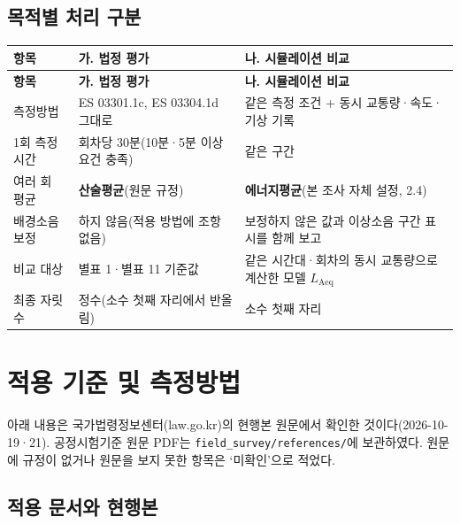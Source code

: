 \documentclass[10.5pt,a4paper]{article}
\newcommand{\Laeq}{\ensuremath{L_{\mathrm{Aeq}}}}
\newcommand{\hd}[1]{\cellcolor{headfill}\textbf{\sffamily #1}}
\begin{document}
\subsection{목적별 처리 구분}
\small
\begin{longtable}{>{\raggedright\arraybackslash}p{}>{\raggedright\arraybackslash}p{}>{\raggedright\arraybackslash}p{}}
\toprule
\hd{항목} & \hd{가. 법정 평가} & \hd{나. 시뮬레이션 비교} \\ \midrule
\endfirsthead
\toprule
\hd{항목} & \hd{가. 법정 평가} & \hd{나. 시뮬레이션 비교} \\ \midrule
\endhead
\bottomrule
\endlastfoot
측정방법 & ES 03301.1c, ES 03304.1d 그대로 & 같은 측정 조건 + 동시 교통량·속도·기상 기록 \\ \midrule
1회 측정시간 & 회차당 30분(10분·5분 이상 요건 충족) & 같은 구간 \\ \midrule
여러 회 평균 & \textbf{산술평균}(원문 규정) & \textbf{에너지평균}(본 조사 자체 설정, 2.4) \\ \midrule
배경소음 보정 & 하지 않음(적용 방법에 조항 없음) & 보정하지 않은 값과 이상소음 구간 표시를 함께 보고 \\ \midrule
비교 대상 & 별표 1·별표 11 기준값 & 같은 시간대·회차의 동시 교통량으로 계산한 모델 \Laeq \\ \midrule
최종 자릿수 & 정수(소수 첫째 자리에서 반올림) & 소수 첫째 자리 \\
\end{longtable}
\addtocounter{table}{-1}
\normalsize
{}\section{적용 기준 및 측정방법}
아래 내용은 국가법령정보센터(law.go.kr)의 현행본 원문에서 확인한 것이다(2026-10-19·21). 공정시험기준 원문 PDF는 \texttt{field\_survey/references/}에 보관하였다. 원문에 규정이 없거나 원문을 보지 못한 항목은 `미확인'으로 적었다.
\subsection{적용 문서와 현행본}
\small
\end{document}
